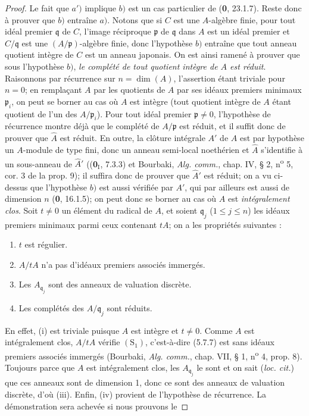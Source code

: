 \begin{proof}
Le fait que $a')$ implique $b)$ est un cas particulier de (\textbf{0}, 23.1.7). Reste
donc à prouver que $b)$ entraîne $a)$. Notons que si $C$ est une $A$-algèbre
finie, pour tout idéal premier $\mathfrak q$ de $C$, l'image réciproque
$\mathfrak p$ de $\mathfrak q$ dans $A$ est un idéal premier et
$C/\mathfrak q$ est une $(A/\mathfrak p)$-algèbre finie, donc l'hypothèse $b)$
entraîne que tout anneau quotient intègre de $C$ est un anneau japonais. On est
ainsi ramené à prouver que sous l'hypothèse $b)$, \emph{le complété de tout quotient
intègre de $A$ est réduit}. Raisonnons par récurrence sur $n=\dim(A)$,
l'assertion étant triviale pour $n=0$; en remplaçant $A$ par les quotients de
$A$ par ses idéaux premiers minimaux $\mathfrak p_i$, on peut se borner au cas
où $A$ est intègre (tout quotient intègre de $A$ étant quotient de l'un des
$A/\mathfrak p_i$). Pour tout idéal premier $\mathfrak p\neq0$, l'hypothèse de
récurrence montre déjà que le complété de $A/\mathfrak p$ est réduit, et il
suffit donc de prouver que $\widehat A$ est réduit. En outre, la clôture
intégrale $A'$ de $A$ est par hypothèse un $A$-module de type fini, donc un
anneau semi-local noethérien et $\widehat A$ s'identifie à un sous-anneau de
$\widehat{A}'$ ((\textbf{0}$_{\mathrm I}$, 7.3.3) et Bourbaki, \emph{Alg. comm.}, chap.
IV, § 2, n\textsuperscript{o} 5, cor. 3 de la prop. 9); il suffira donc de
prouver que $\widehat{A}'$ est réduit; on a vu ci-dessus que l'hypothèse $b)$
est aussi vérifiée par $A'$, qui par ailleurs est aussi de dimension $n$
(\textbf{0}, 16.1.5); on peut donc se borner au cas où $A$ est \emph{intégralement clos}. Soit
$t\neq0$ un élément du radical de $A$, et soient $\mathfrak q_j$
($1\leq j\leq n$) les idéaux premiers minimaux parmi ceux contenant $tA$; on a
les propriétés suivantes :
\begin{enumerate}
\item[(i)] $t$ est régulier.
\item[(ii)] $A/tA$ n'a pas d'idéaux premiers associés immergés.
\item[(iii)] Les $A_{\mathfrak q_j}$ sont des anneaux de valuation
discrète.
\item[(iv)] Les complétés des $A/\mathfrak q_j$ sont réduits.
\end{enumerate}

En effet, (i) est triviale puisque $A$ est intègre et $t\neq0$. Comme $A$ est
intégralement clos, $A/tA$ vérifie $(\mathrm S_1)$, c'est-à-dire (5.7.7) est
sans idéaux premiers associés immergés (Bourbaki, \emph{Alg. comm.}, chap. VII,
§ 1, n\textsuperscript{o} 4, prop. 8). Toujours parce que $A$ est
intégralement
clos, les $A_{\mathfrak q_j}$ le sont et on sait (\emph{loc. cit.}) que ces
anneaux sont de dimension 1, donc ce sont des anneaux de valuation discrète,
d'où (iii). Enfin, (iv) provient de l'hypothèse de récurrence. La démonstration
sera achevée si nous prouvons le


\end{proof}
